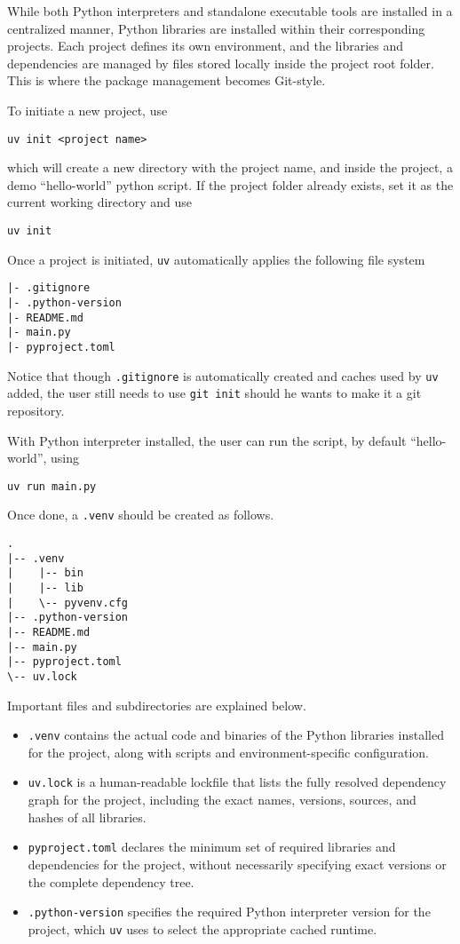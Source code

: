 While both Python interpreters and standalone executable tools are installed in a centralized manner, Python libraries are installed within their corresponding projects. Each project defines its own environment, and the libraries and dependencies are managed by files stored locally inside the project root folder. This is where the package management becomes Git-style.

To initiate a new project, use
\begin{lstlisting}
uv init <project name>
\end{lstlisting}
which will create a new directory with the project name, and inside the project, a demo ``hello-world'' python script. If the project folder already exists, set it as the current working directory and use
\begin{lstlisting}
uv init
\end{lstlisting}

Once a project is initiated, \verb|uv| automatically applies the following file system
\begin{lstlisting}
|- .gitignore
|- .python-version
|- README.md
|- main.py
|- pyproject.toml
\end{lstlisting}

Notice that though \verb|.gitignore| is automatically created and caches used by \verb|uv| added, the user still needs to use \verb|git init| should he wants to make it a git repository.

With Python interpreter installed, the user can run the script, by default ``hello-world'', using
\begin{lstlisting}
uv run main.py
\end{lstlisting}
Once done, a \verb|.venv| should be created as follows.
\begin{lstlisting}
.
|-- .venv
|    |-- bin
|    |-- lib
|    \-- pyvenv.cfg
|-- .python-version
|-- README.md
|-- main.py
|-- pyproject.toml
\-- uv.lock
\end{lstlisting}

Important files and subdirectories are explained below.
\begin{itemize}
	\item \verb|.venv| contains the actual code and binaries of the Python libraries installed for the project, along with scripts and environment-specific configuration.
	\item \verb|uv.lock| is a human-readable lockfile that lists the fully resolved dependency graph for the project, including the exact names, versions, sources, and hashes of all libraries.
	\item \verb|pyproject.toml| declares the minimum set of required libraries and dependencies for the project, without necessarily specifying exact versions or the complete dependency tree.
	\item \verb|.python-version| specifies the required Python interpreter version for the project, which \verb|uv| uses to select the appropriate cached runtime.
\end{itemize}

